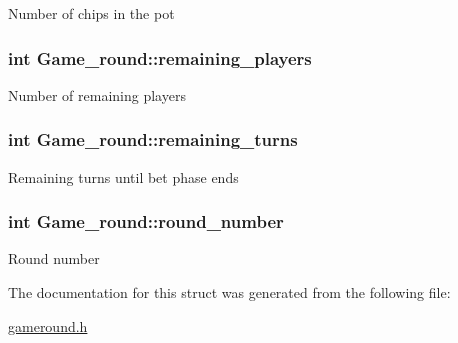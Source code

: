 Number of chips in the pot \hypertarget{structGame__round_a11790ed09816dd873ec0dd4af2975069}{
\subsubsection[{remaining\+\_\+players}]{\setlength{\rightskip}{0pt plus 5cm}int Game\+\_\+round\+::remaining\+\_\+players}}\label{structGame__round_a11790ed09816dd873ec0dd4af2975069}
Number of remaining players \hypertarget{structGame__round_a40236e950983508542529a1e5bba790b}{
\subsubsection[{remaining\+\_\+turns}]{\setlength{\rightskip}{0pt plus 5cm}int Game\+\_\+round\+::remaining\+\_\+turns}}\label{structGame__round_a40236e950983508542529a1e5bba790b}
Remaining turns until bet phase ends \hypertarget{structGame__round_adab8aba7da87ebc3ccf673e7a6e225db}{
\subsubsection[{round\+\_\+number}]{\setlength{\rightskip}{0pt plus 5cm}int Game\+\_\+round\+::round\+\_\+number}}\label{structGame__round_adab8aba7da87ebc3ccf673e7a6e225db}
Round number 

The documentation for this struct was generated from the following file\+:\begin{DoxyCompactItemize}
\item 
\hyperlink{gameround_8h}{gameround.\+h}\end{DoxyCompactItemize}
